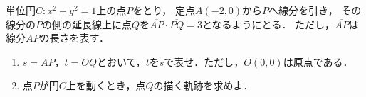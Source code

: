 \documentclass[../../main.tex]{subfiles}
\begin{document}
単位円$C:x^2+y^2=1$上の点$P$をとり，
定点$A(-2,0)$から$P$へ線分を引き，
その線分の$P$の側の延長線上に点$Q$を$\overline{AP}\cdot\overline{PQ}=3$となるようにとる．
ただし，$\overline{AP}$は線分$AP$の長さを表す．
\begin{enumerate}
  \item $s=\overline{AP}$，$t=\overline{OQ}$とおいて，$t$を$s$で表せ．ただし，$O(0,0)$は原点である．
  \item 点$P$が円$C$上を動くとき，点$Q$の描く軌跡を求めよ．
\end{enumerate}
\end{document}
